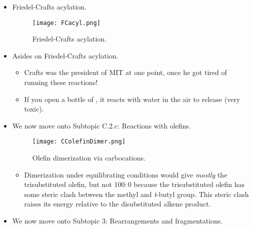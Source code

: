 \documentclass[../notes.tex]{subfiles}
\begin{document}
\begin{itemize}
\begin{figure}[H]
        \texttt{[image: Hock.png]}
        \caption{Hock process (stage 1).}
        \label{fig:Hock}
    \end{figure}
    \begin{itemize}
        \item This is the primary method of producing acetone.\footnote{You can read more about this process --- called the \textbf{Hock process} --- on \href{https://en.wikipedia.org/wiki/Cumene_process}{Wikipedia}.}
        \item It astounds Prof. Buchwald that this is economical: Indeed, it's easier to attach the isopropyl group to benzene and then rip it apart again, then it is to convert it directly to acetone.
    \end{itemize}
    \item Friedel-Crafts acylation.
    \begin{figure}[h!]
        \centering
        \texttt{[image: FCacyl.png]}
        \caption{Friedel-Crafts acylation.}
        \label{fig:FCacyl}
    \end{figure}
    \item Asides on Friedel-Crafts acylation.
    \begin{itemize}
        \item Crafts was the president of MIT at one point, once he got tired of running these reactions!
        \item If you open a bottle of , it reacts with water in the air to release  (very toxic).
    \end{itemize}
    \item We now move onto Subtopic C.2.c{}: Reactions with olefins.
    \begin{figure}[h!]
        \centering
        \texttt{[image: CColefinDimer.png]}
        \caption{Olefin dimerization via carbocations.}
        \label{fig:CColefinDimer}
    \end{figure}
    \begin{itemize}
        \item Dimerization under equilibrating conditions would give \emph{mostly} the trisubstituted olefin, but not $100:0$ because the trisubstituted olefin has some steric clash between the methyl and \emph{t}-butyl group. This steric clash raises its energy relative to the disubstituted alkene product.
    \end{itemize}
    \item We now move onto Subtopic 3: Rearrangements and fragmentations.

\end{itemize}
\end{document}
